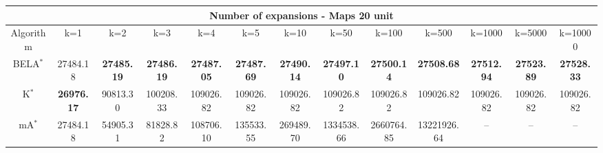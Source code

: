\begin{tabular}{c|cccccccccccc}\toprule
\multicolumn{13}{c}{Number of expansions - Maps 20 unit}\\ \midrule
Algorithm & k=1 & k=2 & k=3 & k=4 & k=5 & k=10 & k=50 & k=100 & k=500 & k=1000 & k=5000 & k=10000 \\ \midrule
BELA$^*$ & 27484.18 & \textbf{27485.19} & \textbf{27486.19} & \textbf{27487.05} & \textbf{27487.69} & \textbf{27490.14} & \textbf{27497.10} & \textbf{27500.14} & \textbf{27508.68} & \textbf{27512.94} & \textbf{27523.89} & \textbf{27528.33} \\
K$^*$ & \textbf{26976.17} & 90813.30 & 100208.33 & 109026.82 & 109026.82 & 109026.82 & 109026.82 & 109026.82 & 109026.82 & 109026.82 & 109026.82 & 109026.82 \\
mA$^*$ & 27484.18 & 54905.31 & 81828.82 & 108706.10 & 135533.55 & 269489.70 & 1334538.66 & 2660764.85 & 13221926.64 & -- & -- & -- \\ \bottomrule 
\end{tabular}
